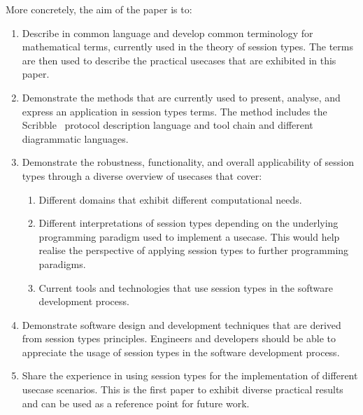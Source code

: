 More concretely, the aim of the paper is to:
%
\begin{enumerate}
	\item	Describe in common language and develop common terminology
			for mathematical terms, currently used in the theory of
			session types.
			The terms are then used to describe the practical usecases
			that are exhibited in this paper.

	\item	Demonstrate the methods that are currently used to present,
			analyse, and express an application in session types terms.
			The method includes the Scribble~\cite{scribble}
			protocol description language and tool chain and different
			diagrammatic languages.

	\item	Demonstrate the robustness, functionality, and overall applicability
			of session types through a diverse overview of usecases that cover:
			\begin{enumerate}[label=$\bullet$]

				\item	Different domains that exhibit different computational needs.

				\item	Different interpretations of session types
						depending on the underlying programming paradigm used to implement a usecase.
						This would help realise the perspective of applying session types to
						further programming paradigms.


				\item	Current tools and
						technologies that use session types in the software development
						process.
			\end{enumerate}

	\item	Demonstrate software design and development techniques that
			are derived from session types principles. Engineers and
			developers should be able to appreciate the usage of session types
			in the software development process.
		
	\item	Share the experience in using session types for the
			implementation of different usecase scenarios. This
			is the first paper to exhibit diverse practical results
			and can be used as a reference point for future work.
\end{enumerate}


